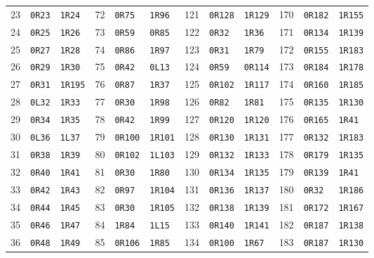 \begin{center}
\begin{tabular}{@{}rll@{\hspace{4mm}}rll@{\hspace{4mm}}rll@{\hspace{4mm}}rll@{}}
23 & \texttt{0R23} & \texttt{1R24} & 72 & \texttt{0R75} & \texttt{1R96} & 121 & \texttt{0R128} & \texttt{1R129} & 170 & \texttt{0R182} & \texttt{1R155}\\
24 & \texttt{0R25} & \texttt{1R26} & 73 & \texttt{0R59} & \texttt{0R85} & 122 & \texttt{0R32} & \texttt{1R36} & 171 & \texttt{0R134} & \texttt{1R139}\\
25 & \texttt{0R27} & \texttt{1R28} & 74 & \texttt{0R86} & \texttt{1R97} & 123 & \texttt{0R31} & \texttt{1R79} & 172 & \texttt{0R155} & \texttt{1R183}\\
26 & \texttt{0R29} & \texttt{1R30} & 75 & \texttt{0R42} & \texttt{0L13} & 124 & \texttt{0R59} & \texttt{0R114} & 173 & \texttt{0R184} & \texttt{1R178}\\
27 & \texttt{0R31} & \texttt{1R195} & 76 & \texttt{0R87} & \texttt{1R37} & 125 & \texttt{0R102} & \texttt{1R117} & 174 & \texttt{0R160} & \texttt{1R185}\\
28 & \texttt{0L32} & \texttt{1R33} & 77 & \texttt{0R30} & \texttt{1R98} & 126 & \texttt{0R82} & \texttt{1R81} & 175 & \texttt{0R135} & \texttt{1R130}\\
29 & \texttt{0R34} & \texttt{1R35} & 78 & \texttt{0R42} & \texttt{1R99} & 127 & \texttt{0R120} & \texttt{1R120} & 176 & \texttt{0R165} & \texttt{1R41}\\
30 & \texttt{0L36} & \texttt{1L37} & 79 & \texttt{0R100} & \texttt{1R101} & 128 & \texttt{0R130} & \texttt{1R131} & 177 & \texttt{0R132} & \texttt{1R183}\\
31 & \texttt{0R38} & \texttt{1R39} & 80 & \texttt{0R102} & \texttt{1L103} & 129 & \texttt{0R132} & \texttt{1R133} & 178 & \texttt{0R179} & \texttt{1R135}\\
32 & \texttt{0R40} & \texttt{1R41} & 81 & \texttt{0R30} & \texttt{1R80} & 130 & \texttt{0R134} & \texttt{1R135} & 179 & \texttt{0R139} & \texttt{1R41}\\
33 & \texttt{0R42} & \texttt{1R43} & 82 & \texttt{0R97} & \texttt{1R104} & 131 & \texttt{0R136} & \texttt{1R137} & 180 & \texttt{0R32} & \texttt{1R186}\\
34 & \texttt{0R44} & \texttt{1R45} & 83 & \texttt{0R30} & \texttt{1R105} & 132 & \texttt{0R138} & \texttt{1R139} & 181 & \texttt{0R172} & \texttt{1R167}\\
35 & \texttt{0R46} & \texttt{1R47} & 84 & \texttt{1R84} & \texttt{1L15} & 133 & \texttt{0R140} & \texttt{1R141} & 182 & \texttt{0R187} & \texttt{1R138}\\
36 & \texttt{0R48} & \texttt{1R49} & 85 & \texttt{0R106} & \texttt{1R85} & 134 & \texttt{0R100} & \texttt{1R67} & 183 & \texttt{0R187} & \texttt{1R130}\\

\end{tabular}
\end{center}
